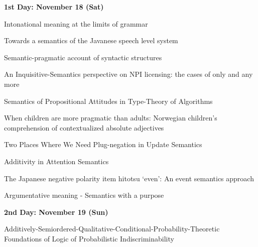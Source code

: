 \documentclass[12pt]{jarticle}
\begin{document}
\noindent\textbf{\large 
1st Day: November 18 (Sat)
}\\







  
      {Intonational meaning at the limits of grammar}
      {}
  
      {Towards a semantics of the Javanese speech level system}
      {}
  
      {Semantic-pragmatic account of syntactic structures}
      {}



 
  
      {An Inquisitive-Semantics perspective on NPI licensing: the cases of only and any more}
      {}
  
      {Semantics of Propositional Attitudes in Type-Theory of Algorithms}
      {}
  
      {When children are more pragmatic than adults: Norwegian children’s comprehension of contextualized absolute adjectives}
      {}



 
  
      {Two Places Where We Need Plug-negation in Update Semantics}
      {}
  
      {Additivity in Attention Semantics}
      {}
  
      {The Japanese negative polarity item hitotsu ‘even’: An event semantics approach}
      {}




  
      {Argumentative meaning - Semantics with a purpose}
      {}




\noindent\textbf{\large 
2nd Day: November 19 (Sun)
}\\




  
      {Additively-Semiordered-Qualitative-Conditional-Probability-Theoretic Foundations of Logic of Probabilistic Indiscriminability}
      {}
  
\end{document}
